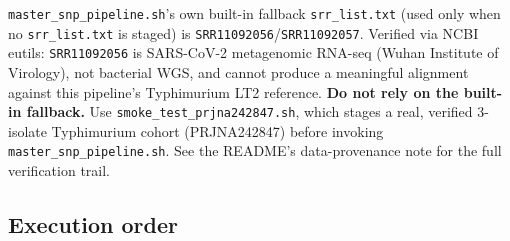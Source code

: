 \documentclass[
]{article}
\begin{document}
\texttt{master\_snp\_pipeline.sh}'s own built-in fallback
\texttt{srr\_list.txt} (used only when no \texttt{srr\_list.txt} is
staged) is \texttt{SRR11092056}/\texttt{SRR11092057}. Verified via NCBI
eutils: \texttt{SRR11092056} is SARS-CoV-2 metagenomic RNA-seq (Wuhan
Institute of Virology), not bacterial WGS, and cannot produce a
meaningful alignment against this pipeline's Typhimurium LT2 reference.
\textbf{Do not rely on the built-in fallback.} Use
\texttt{smoke\_test\_prjna242847.sh}, which stages a real, verified
3-isolate Typhimurium cohort (PRJNA242847) before invoking
\texttt{master\_snp\_pipeline.sh}. See the README's data-provenance note
for the full verification trail.

\subsection{Execution order}\label{execution-order}
\end{document}
